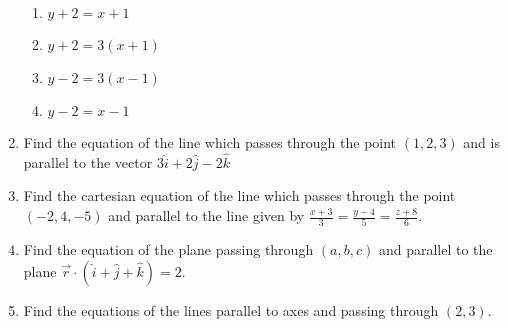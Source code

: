\begin{enumerate}[label=\thesubsection.\arabic*, ref=\thesubsection.\theenumi]
\begin{enumerate}
\item $y+2=x+1$
\item $y+2=3(x+1)$
\item $y-2=3(x-1)$
\item $y-2=x-1$
\end{enumerate}
\item  Find the equation of the line which passes through the point $(1, 2, 3)$ and is parallel to the vector $3\hat{i}+2\hat{j}-2\hat{k}$
\item Find the cartesian equation of the line which passes through the point $(-2, 4, -5)$ and parallel to the line given by $ \frac{x+3}{3}=\frac{y-4}{5}=\frac{z+8}{6}$.
\item Find the equation of the plane passing through $(a, b, c)$ and parallel to the plane $\overrightarrow{r} \cdot (\hat{i}+\hat{j}+\hat{k})=2$.
\item Find the equations of the lines parallel to axes and passing through $(2,3)$.
\end{enumerate}
